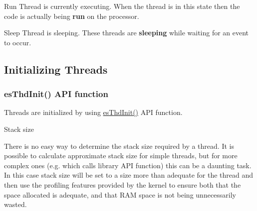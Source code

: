 \begin{DoxyParagraph}{Run}
Thread is currently executing. When the thread is in this state then the code is actually being {\bfseries run} on the processor.
\end{DoxyParagraph}
\begin{DoxyParagraph}{Sleep}
Thread is sleeping. These threads are {\bfseries sleeping} while waiting for an event to occur.
\end{DoxyParagraph}
\hypertarget{threads_thd_create}{}\subsection{Initializing Threads}\label{threads_thd_create}
\hypertarget{threads_thd_create_init}{}\subsubsection{es\-Thd\-Init() A\-P\-I function}\label{threads_thd_create_init}
Threads are initialized by using \hyperlink{group__kern__intf_gac91734f3ee867b519f59bf81cc7fde88}{es\-Thd\-Init()} A\-P\-I function.

\begin{DoxyParagraph}{Stack size}

\end{DoxyParagraph}
There is no easy way to determine the stack size required by a thread. It is possible to calculate approximate stack size for simple threads, but for more complex ones (e.\-g. which calls library A\-P\-I function) this can be a daunting task. In this case stack size will be set to a size more than adequate for the thread and then use the profiling features provided by the kernel to ensure both that the space allocated is adequate, and that R\-A\-M space is not being unnecessarily wasted. 